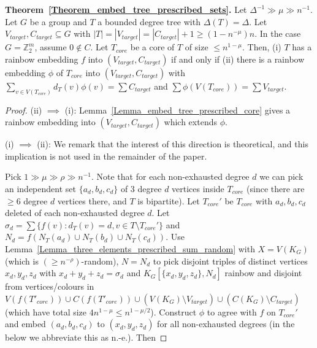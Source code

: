 \documentclass[a4paper,11pt,hidelinks]{amsart}
\theoremstyle{definition}
\newcommand{\id}{{0}}%
\begin{document}
\vspace{2mm}
\noindent \textbf{Theorem~\ref{Theorem_embed_tree_prescribed_sets}.}
Let $\Delta^{-1}\gg\mu\gg n^{-1}$.
Let $G$ be a group and $T$ a bounded degree tree with $\Delta(T)=\Delta$. Let $V_{target},C_{target}\subseteq G$ with $|T|=|V_{target}|=|C_{target}|+1\geq (1-n^{-\mu})n$. In the case $G=\mathbb{Z}_2^m$, assume $\id \not\in C$. Let $T_{core}$ be a core of $T$ of size $\leq n^{1-\mu}$. Then,  (i) $T$ has a rainbow  embedding $f$ into $(V_{target},C_{target})$ if and only if (ii) there is a rainbow embedding $\phi$ of $T_{core}$ into $(V_{target},C_{target})$ with $\sum_{v\in V(T_{core})}d_T(v)\phi(v)=\sum C_{target}$ and $\sum \phi(V(T_{core}))=\sum V_{target}$.
\begin{proof}
(ii) $\implies$ (i): 
Lemma~\ref{Lemma_embed_tree_prescribed_core} gives a rainbow embedding into $(V_{target},C_{target})$ which extends $\phi$.

(i) $\implies$ (ii): We remark that the interest of this direction is theoretical, and this implication is not used in the remainder of the paper. 

\par Pick $1\gg \mu\gg \rho\gg n^{-1}$. Note that for each non-exhausted degree $d$ we can pick  an independent set $\{a_d, b_d, c_d\}$ of 3 degree $d$ vertices inside $T_{core}$ (since there are $\geq 6$ degree $d$ vertices there, and $T$ is bipartite). 
Let $T_{core}'$ be $T_{core}$ with $a_d, b_d, c_d$ deleted of each non-exhausted  degree $d$.  Let $\sigma_d=\sum\{f(v): d_T(v)=d, v\in T\setminus T_{core}'\}$ and $N_d=f(N_T(a_d)\cup N_T(b_d)\cup N_T(c_d))$. Use Lemma~\ref{Lemma_three_elements_prescribed_sum_random} with $X=V(K_G)$ (which is $(\geq n^{-\rho})$-random), $N=N_d$ to pick disjoint triples of distinct vertices $x_d, y_d, z_d$  with $x_d+y_d+z_d=\sigma_d$ and $K_G[\{x_d, y_d, z_d\}, N_d]$ rainbow  and disjoint from vertices/colours in  $V(f(T'_{core}))\cup C(f(T'_{core}))\cup (V(K_G)\setminus V_{target})\cup (C(K_G)\setminus C_{target})$ (which have total size $4n^{1-\mu}\leq n^{1-\mu/2}$). Construct $\phi$ to agree with $f$ on $T_{core}'$ and embed $(a_d, b_d, c_d)$ to $(x_d, y_d, z_d)$ for all non-exhausted degrees (in the below we abbreviate this as n.-e.). Then 




\end{proof}
\end{document}
